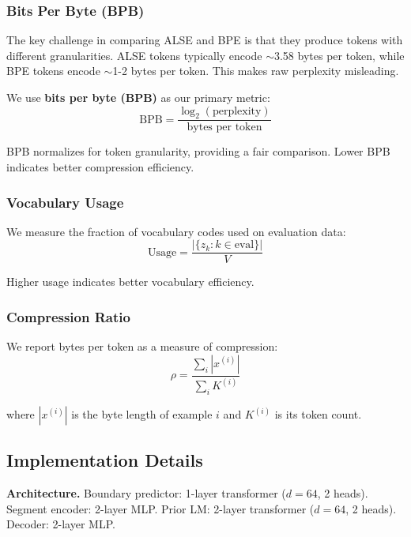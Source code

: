 \documentclass{article}
\begin{document}
\subsubsection{Bits Per Byte (BPB)}

The key challenge in comparing ALSE and BPE is that they produce tokens with different granularities. ALSE tokens typically encode $\sim$3.58 bytes per token, while BPE tokens encode $\sim$1-2 bytes per token. This makes raw perplexity misleading.

We use \textbf{bits per byte (BPB)} as our primary metric:
\begin{equation}
\text{BPB} = \frac{\log_2(\text{perplexity})}{\text{bytes per token}}
\end{equation}

BPB normalizes for token granularity, providing a fair comparison. Lower BPB indicates better compression efficiency.

\subsubsection{Vocabulary Usage}

We measure the fraction of vocabulary codes used on evaluation data:
\begin{equation}
\text{Usage} = \frac{|\{z_k : k \in \text{eval}\}|}{V}
\end{equation}

Higher usage indicates better vocabulary efficiency.

\subsubsection{Compression Ratio}

We report bytes per token as a measure of compression:
\begin{equation}
\rho = \frac{\sum_i |x^{(i)}|}{\sum_i K^{(i)}}
\end{equation}

where $|x^{(i)}|$ is the byte length of example $i$ and $K^{(i)}$ is its token count.

\subsection{Implementation Details}

\textbf{Architecture.} Boundary predictor: 1-layer transformer ($d=64$, 2 heads). Segment encoder: 2-layer MLP. Prior LM: 2-layer transformer ($d=64$, 2 heads). Decoder: 2-layer MLP.
\end{document}
